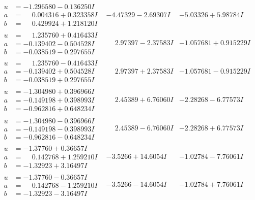 \documentclass[1p]{elsarticle_modified}
\theoremstyle{definition}
\begin{document}
$$\begin{array}{c|c|c}
\begin{aligned}
u &= -1.296580 - 0.136250 I \\
a &= \phantom{-}0.004316 + 0.323358 I \\
b &= \phantom{-}0.429924 + 1.218120 I\end{aligned}
 & -4.47329 - 2.69307 I & -5.03326 + 5.98784 I \\ \hline\begin{aligned}
u &= \phantom{-}1.235760 + 0.416433 I \\
a &= -0.139402 - 0.504528 I \\
b &= -0.038519 - 0.297655 I\end{aligned}
 & \phantom{-}2.97397 - 2.37583 I & -1.057681 + 0.915229 I \\ \hline\begin{aligned}
u &= \phantom{-}1.235760 - 0.416433 I \\
a &= -0.139402 + 0.504528 I \\
b &= -0.038519 + 0.297655 I\end{aligned}
 & \phantom{-}2.97397 + 2.37583 I & -1.057681 - 0.915229 I \\ \hline\begin{aligned}
u &= -1.304980 + 0.396966 I \\
a &= -0.149198 + 0.398993 I \\
b &= -0.962816 + 0.648234 I\end{aligned}
 & \phantom{-}2.45389 + 6.76060 I & -2.28268 - 6.77573 I \\ \hline\begin{aligned}
u &= -1.304980 - 0.396966 I \\
a &= -0.149198 - 0.398993 I \\
b &= -0.962816 - 0.648234 I\end{aligned}
 & \phantom{-}2.45389 - 6.76060 I & -2.28268 + 6.77573 I \\ \hline\begin{aligned}
u &= -1.37760 + 0.36657 I \\
a &= \phantom{-}0.142768 + 1.259210 I \\
b &= -1.32923 + 3.16497 I\end{aligned}
 & -3.5266 + 14.6054 I & -1.02784 - 7.76061 I \\ \hline\begin{aligned}
u &= -1.37760 - 0.36657 I \\
a &= \phantom{-}0.142768 - 1.259210 I \\
b &= -1.32923 - 3.16497 I\end{aligned}
 & -3.5266 - 14.6054 I & -1.02784 + 7.76061 I \\ \hline\begin{aligned}

\end{aligned}
\end{array}$$
\end{document}
